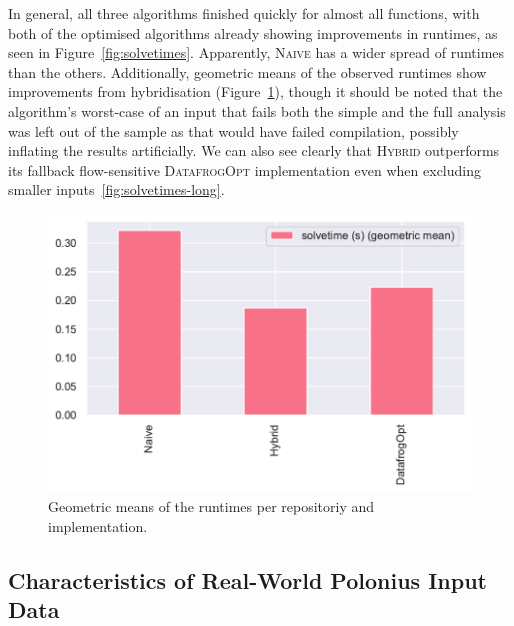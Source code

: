 \documentclass[11pt,a4paper,twoside,openany,draft]{report}
\begin{document}
In general, all three algorithms finished quickly for almost all functions, with
both of the optimised algorithms already showing improvements in runtimes, as
seen in Figure~\ref{fig:solvetimes}. Apparently, \textsc{Naive} has a wider
spread of runtimes than the others. Additionally, geometric means of the
observed runtimes show improvements from hybridisation
(Figure~\ref{fig:solvetimes-gmean-repo}), though it should be noted that the
algorithm's worst-case of an input that fails both the simple and the full
analysis was left out of the sample as that would have failed compilation,
possibly inflating the results artificially. We can also see clearly that
\textsc{Hybrid} outperforms its fallback flow-sensitive \textsc{DatafrogOpt}
implementation even when excluding smaller inputs~\ref{fig:solvetimes-long}.

\begin{figure}
  \includegraphics[width=0.5\linewidth]{Graphs/solvetimes_repo_gmean.pdf}
  \caption[Geometric Means of Runtimes Per Repository]{Geometric means of the
    runtimes per repositoriy and implementation.}
  \label{fig:solvetimes-gmean-repo}
\end{figure}


\subsection{Characteristics of Real-World Polonius Input
  Data}\label{sec:inputs:inputs}
\end{document}
